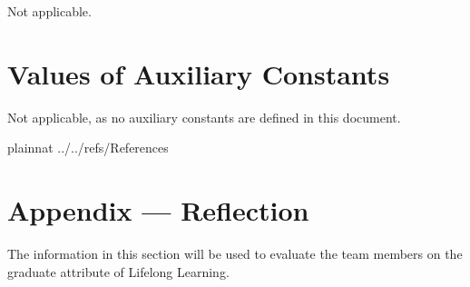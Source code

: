 \documentclass[12pt]{article}
\begin{document}
Not applicable.

\section{Values of Auxiliary Constants}
Not applicable, as no auxiliary constants are defined in this document.

\newpage

 {plainnat}
 {../../refs/References}

\newpage

\newpage{}
\section*{Appendix --- Reflection}


The information in this section will be used to evaluate the team members on the
graduate attribute of Lifelong Learning.  


%


%
\end{document}
